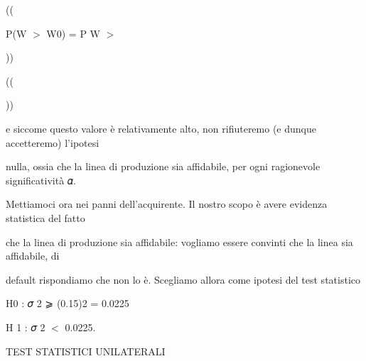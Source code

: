 \documentclass[a4paper,portrait,12pt]{article}
\begin{document}
((





\begin{flushleft}
P(W $>$ W0) = P W $>$
\end{flushleft}





))





((





))





\begin{flushleft}
e siccome questo valore \`{e} relativamente alto, non rifiuteremo (e dunque accetteremo) l'ipotesi
\end{flushleft}


\begin{flushleft}
nulla, ossia che la linea di produzione sia affidabile, per ogni ragionevole significativit\`{a} 𝛼.
\end{flushleft}


\begin{flushleft}
Mettiamoci ora nei panni dell'acquirente. Il nostro scopo \`{e} avere evidenza statistica del fatto
\end{flushleft}


\begin{flushleft}
che la linea di produzione sia affidabile: vogliamo essere convinti che la linea sia affidabile, di
\end{flushleft}


\begin{flushleft}
default rispondiamo che non lo \`{e}. Scegliamo allora come ipotesi del test statistico
\end{flushleft}


\begin{flushleft}
H0 : 𝜎 2 ⩾ (0.15)2 = 0.0225
\end{flushleft}


\begin{flushleft}
H 1 : 𝜎 2 $<$ 0.0225.
\end{flushleft}





\begin{flushleft}
 TEST STATISTICI UNILATERALI
\end{flushleft}
\end{document}
